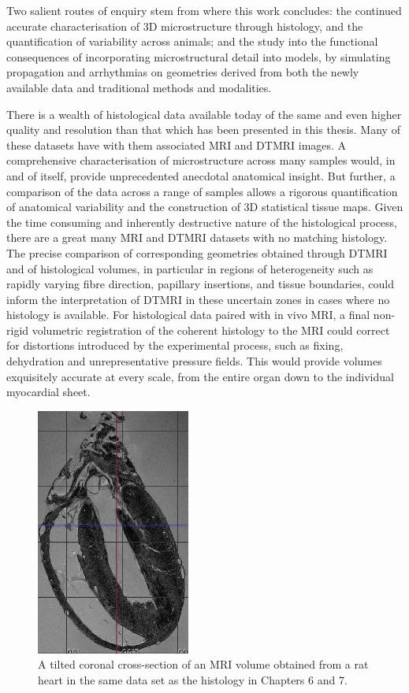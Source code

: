  Two salient routes of enquiry stem from where this work concludes: the continued accurate characterisation of 3D microstructure through histology, and the quantification of variability across animals; and the study into the functional consequences of incorporating microstructural detail into models, by simulating propagation and arrhythmias on geometries derived from both the newly available data and traditional methods and modalities.
  
  There is a wealth of histological data available today of the same and even higher quality and resolution than that which has been presented in this thesis. Many of these datasets have with them associated MRI and DTMRI images. A comprehensive characterisation of microstructure across many samples would, in and of itself, provide unprecedented anecdotal anatomical insight. But further, a comparison of the data across a range of samples allows a rigorous quantification of anatomical variability and the construction of 3D statistical tissue maps. Given the time consuming and inherently destructive nature of the histological process, there are a great many MRI and DTMRI datasets with no matching histology. The precise comparison of corresponding geometries obtained through DTMRI and of histological volumes, in particular in regions of heterogeneity such as rapidly varying fibre direction, papillary insertions, and tissue boundaries, could inform the interpretation of DTMRI in these uncertain zones in cases where no histology is available. For histological data paired with in vivo MRI, a final non-rigid volumetric registration of the coherent histology to the MRI could correct for distortions introduced by the experimental process, such as fixing, dehydration and unrepresentative pressure fields. This would provide volumes exquisitely accurate at every scale, from the entire organ down to the individual myocardial sheet.
  
 \begin{figure}[htbp]
   \centering
   \includegraphics[width=0.45\textwidth]{Ch8/Figs/MRI}
   \caption{A tilted coronal cross-section of an MRI volume obtained from a rat heart in the same data set as the histology in Chapters 6 and 7.}
   \label{fig:MRI}
 \end{figure}
 
